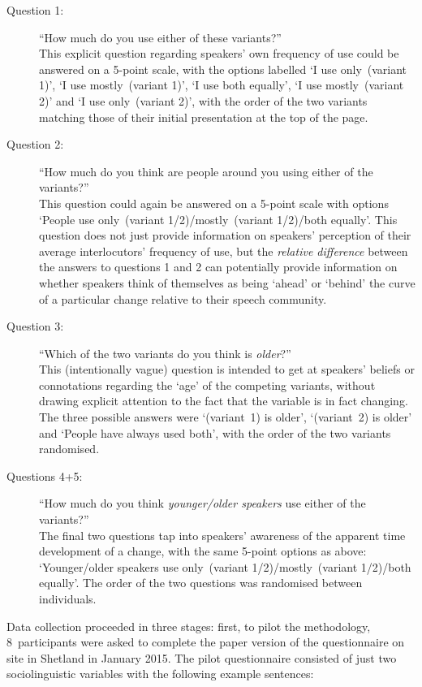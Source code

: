 \begin{description}
\item[Question 1:] ``How much do you use either of these variants?'' \hfill \\ This explicit question regarding speakers' own frequency of use could be answered on a 5-point scale, with the options labelled `I use only~(variant 1)', `I use mostly~(variant 1)', `I use both equally', `I use mostly~(variant 2)' and `I use only~(variant 2)', with the order of the two variants matching those of their initial presentation at the top of the page. %
\item[Question 2:] ``How much do you think are people around you using either of the variants?'' \hfill \\ This question could again be answered on a 5-point scale with options `People use only~(variant 1/2)/mostly~(variant 1/2)/both equally'. This question does not just provide information on speakers' perception of their average interlocutors' frequency of use, but the \emph{relative difference} between the answers to questions 1 and 2 can potentially provide information on whether speakers think of themselves as being `ahead' or `behind' the curve of a particular change relative to their speech community. %
\item[Question 3:] ``Which of the two variants do you think is \emph{older}?'' \hfill \\ This (intentionally vague) question is intended to get at speakers' beliefs or connotations regarding the `age' of the competing variants, without drawing explicit attention to the fact that the variable is in fact changing. The three possible answers were `(variant~1) is older', `(variant~2) is older' and `People have always used both', with the order of the two variants randomised.
\item[Questions 4+5:] ``How much do you think \emph{younger/older speakers} use either of the variants?'' \hfill \\ The final two questions tap into speakers' awareness of the apparent time development of a change, with the same 5-point options as above: `Younger/older speakers use only~(variant 1/2)/mostly~(variant 1/2)/both equally'. The order of the two questions was randomised between individuals.
\end{description}

Data collection proceeded in three stages: first, to pilot the methodology, 8~participants were asked to complete the paper version of the questionnaire on site in Shetland in January 2015. The pilot questionnaire consisted of just two sociolinguistic variables with the following example sentences:

